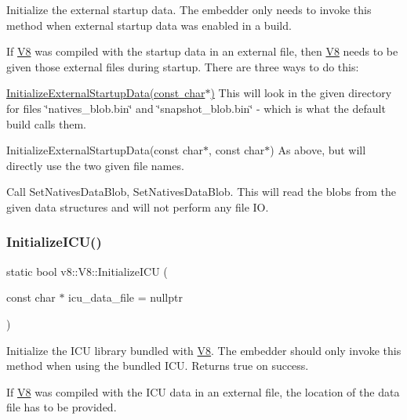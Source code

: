 Initialize the external startup data. The embedder only needs to invoke this method when external startup data was enabled in a build.

If \mbox{\hyperlink{classv8_1_1V8}{V8}} was compiled with the startup data in an external file, then \mbox{\hyperlink{classv8_1_1V8}{V8}} needs to be given those external files during startup. There are three ways to do this\+:
\begin{DoxyItemize}
\item \mbox{\hyperlink{classv8_1_1V8_ad662ec37263887b7fd31c6b498e9466c}{Initialize\+External\+Startup\+Data(const char$\ast$)}} This will look in the given directory for files \char`\"{}natives\+\_\+blob.\+bin\char`\"{} and \char`\"{}snapshot\+\_\+blob.\+bin\char`\"{} -\/ which is what the default build calls them.
\item Initialize\+External\+Startup\+Data(const char$\ast$, const char$\ast$) As above, but will directly use the two given file names.
\item Call Set\+Natives\+Data\+Blob, Set\+Natives\+Data\+Blob. This will read the blobs from the given data structures and will not perform any file IO. 
\end{DoxyItemize}\mbox{\label{classv8_1_1V8_a707f49bb9aef6d01294cd2f2f83939aa}} 
\subsubsection{\texorpdfstring{Initialize\+I\+C\+U()}{InitializeICU()}}
{\footnotesize\ttfamily static bool v8\+::\+V8\+::\+Initialize\+I\+CU (\begin{DoxyParamCaption}\item[{const char $\ast$}]{icu\+\_\+data\+\_\+file = {\ttfamily nullptr} }\end{DoxyParamCaption})\hspace{0.3cm}{\ttfamily [static]}}

Initialize the I\+CU library bundled with \mbox{\hyperlink{classv8_1_1V8}{V8}}. The embedder should only invoke this method when using the bundled I\+CU. Returns true on success.

If \mbox{\hyperlink{classv8_1_1V8}{V8}} was compiled with the I\+CU data in an external file, the location of the data file has to be provided. \mbox{\label{classv8_1_1V8_a133e338f42ab109a51f75b929f7c1500}} 
